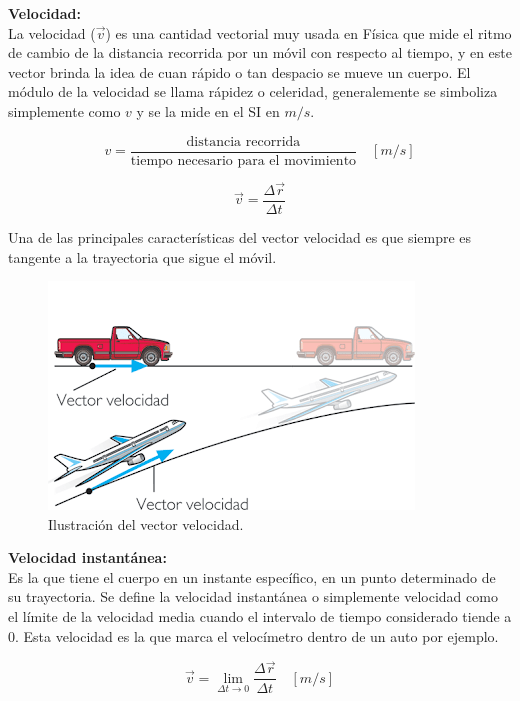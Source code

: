 \textbf{Velocidad:}\\

La velocidad ($\vec{v}$) es una cantidad vectorial muy usada en Física que mide el ritmo de cambio de la distancia recorrida por 
un móvil con respecto al tiempo, y en este vector brinda la idea de cuan rápido o tan despacio se mueve un cuerpo. El módulo de 
la velocidad se llama rápidez o celeridad, generalemente se simboliza simplemente como $v$ y se la mide en el SI en $m/s$. 

\begin{equation}
 v = \frac{\text{distancia recorrida}}{\text{tiempo necesario para el movimiento}} \quad [m/s]
\end{equation}

\begin{equation}
 \vec{v} = \frac{\Delta \vec{r}}{\Delta t}
\end{equation}

Una de las principales características del vector velocidad es que siempre es tangente a la trayectoria que sigue el móvil.

\begin{figure}[ht]
 \centering
 \includegraphics[scale=0.4]{images/vectorvelocidad.png}
 \caption{Ilustración del vector velocidad.}
\end{figure}

\textbf{Velocidad instantánea:}\\

 Es la que tiene el cuerpo en un instante específico, en un punto determinado de su trayectoria. Se define la velocidad 
instantánea o simplemente velocidad como el límite de la velocidad media cuando el intervalo de tiempo considerado tiende a 0. 
Esta velocidad es la que marca el velocímetro dentro de un auto por ejemplo.

 \begin{equation}
 \vec{v}=\lim_{\Delta t \to 0}\frac{\Delta \vec{r}}{\Delta t}\quad [m/s]
 \end{equation}

